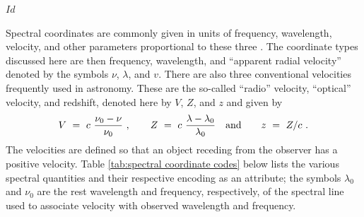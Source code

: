 \svnInfo $Id$


Spectral coordinates are commonly given in units of frequency,
wavelength, velocity, and other parameters proportional to these
three \cite{fits.paper3}. The coordinate types discussed here are then frequency,
wavelength, and “apparent radial velocity” denoted by the symbols
$\nu$, $\lambda$, and $v$. There are also three conventional
velocities frequently used in astronomy. These are the so-called
“radio” velocity, “optical” velocity, and redshift, denoted here by
$V$, $Z$, and $z$ and given by
\begin{displaymath}
  V \ = \ c \ \frac{\nu_{0} - \nu}{\nu_{0}} \ , \qquad
  Z \ = \ c \ \frac{\lambda-\lambda_0}{\lambda_0} \quad \hbox{and} \qquad
  z \ = \ Z/c \ .
\end{displaymath}
The velocities are defined so that an object receding from the observer has a
positive velocity. Table \ref{tab:spectral coordinate codes} below
lists the various spectral quantities and their respective encoding as
an attribute; the symbols $\lambda_{0}$ and $\nu_{0}$ are the rest
wavelength and frequency, respectively, of the spectral line used to
associate velocity with observed wavelength and frequency.

